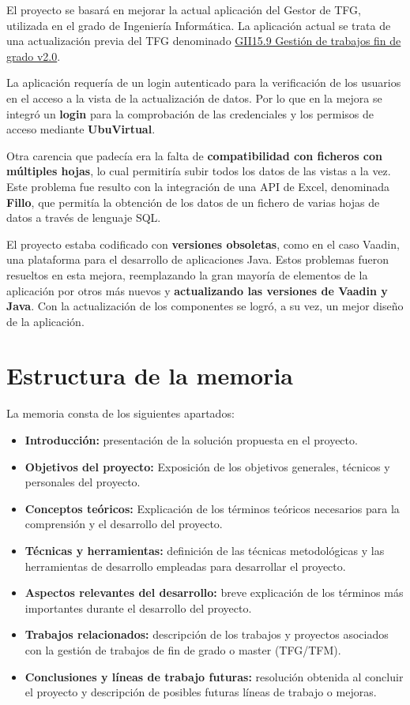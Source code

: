 El proyecto se basará en mejorar la actual aplicación del Gestor de TFG, utilizada en el grado de Ingeniería Informática. La aplicación actual se trata de una actualización previa del TFG denominado \href{https://github.com/jfb0019/Gestor-TFG-2016}{GII15.9 Gestión de trabajos fin de grado v2.0}. 

La aplicación requería de un login autenticado para la verificación de los usuarios en el acceso a la vista de la actualización de datos. Por lo que en la mejora se integró un \textbf{login} para la comprobación de las credenciales y los permisos de acceso mediante \textbf{UbuVirtual}.

Otra carencia que padecía era la falta de \textbf{compatibilidad con ficheros con múltiples hojas}, lo cual permitiría subir todos los datos de las vistas a la vez. Este problema fue resulto con la integración de una API de Excel, denominada \textbf{Fillo}, que permitía la obtención de los datos de un fichero de varias hojas de datos a través de lenguaje SQL.

El proyecto estaba codificado con \textbf{versiones obsoletas}, como en el caso Vaadin, una plataforma para el desarrollo de aplicaciones Java. Estos problemas fueron resueltos en esta mejora, reemplazando la gran mayoría de elementos de la aplicación por otros más nuevos y \textbf{actualizando las versiones de Vaadin y Java}. Con la actualización de los componentes se logró, a su vez, un mejor diseño de la aplicación.

\section{Estructura de la memoria}
La memoria consta de los siguientes apartados:

\begin{itemize}
	\item \textbf{Introducción:} presentación de la solución propuesta en el proyecto. 
	\item \textbf{Objetivos del proyecto:}  Exposición de los  objetivos generales, técnicos y personales del proyecto.
	\item \textbf{Conceptos teóricos:} Explicación de los términos teóricos necesarios para la comprensión y el desarrollo del proyecto.
	\item \textbf{Técnicas y herramientas:} definición de las técnicas metodológicas y las herramientas de desarrollo empleadas para desarrollar el proyecto.
	\item \textbf{Aspectos relevantes del desarrollo:} breve explicación de los términos más importantes durante el desarrollo del proyecto.
	\item \textbf{Trabajos relacionados:} descripción de los trabajos y proyectos asociados con la gestión de trabajos de fin de grado o master (TFG/TFM).
	\item \textbf{Conclusiones y líneas de trabajo futuras:} resolución obtenida al concluir el proyecto y descripción de posibles futuras líneas de trabajo o mejoras.
\end{itemize}